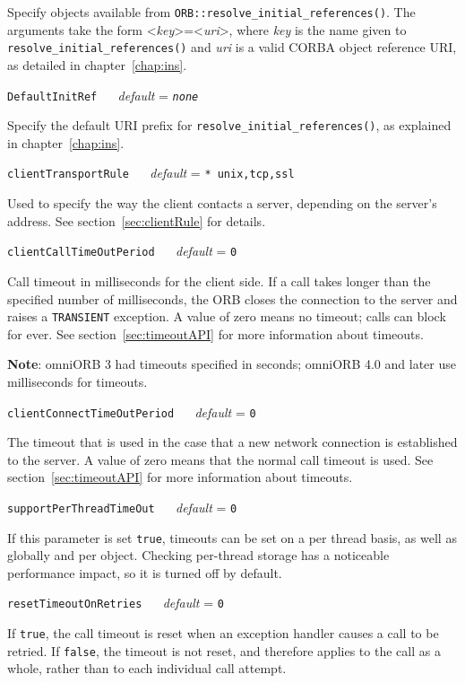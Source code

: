 \documentclass[11pt,twoside,a4paper]{book}
\makeatletter
\newcommand{\code}[1]{\texttt{#1}}
\newcommand{\op}[1]{\texttt{#1()}}
\newcommand{\confopt}[2]
  {\vspace{\baselineskip}\par\noindent\code{#1} ~~ \textit{default} =
   \code{#2}}
\renewcommand{\confopt}[2]
  {\vspace{\baselineskip}\par\noindent\code{#1} ~~ \textit{default} =
   \code{#2}\\[-1ex]\@afterheading}
\newcommand{\dsc}{\discretionary{}{}{}}
\makeatother
\begin{document}
Specify objects available from
\op{ORB::resolve\_initial\_references}. The arguments take the form
<\textit{key}>=<\textit{uri}>, where \textit{key} is the name given to
\op{resolve\_\dsc{}initial\_\dsc{}references} and \textit{uri} is a
valid CORBA object reference URI, as detailed in
chapter~\ref{chap:ins}.


\confopt{DefaultInitRef}{\textit{none}}

Specify the default URI prefix for
\op{resolve\_\dsc{}initial\_\dsc{}references}, as explained in
chapter~\ref{chap:ins}.


\confopt{clientTransportRule}{* unix,tcp,ssl}

Used to specify the way the client contacts a server, depending on the
server's address. See section~\ref{sec:clientRule} for details.


\confopt{clientCallTimeOutPeriod}{0}

Call timeout in milliseconds for the client side. If a call takes
longer than the specified number of milliseconds, the ORB closes the
connection to the server and raises a \code{TRANSIENT} exception. A
value of zero means no timeout; calls can block for ever. See
section~\ref{sec:timeoutAPI} for more information about timeouts.

\vspace{.5\baselineskip}

\noindent\textbf{Note}: omniORB 3 had timeouts specified in seconds;
omniORB 4.0 and later use milliseconds for timeouts.


\confopt{clientConnectTimeOutPeriod}{0}

The timeout that is used in the case that a new network connection is
established to the server. A value of zero means that the normal call
timeout is used. See section~\ref{sec:timeoutAPI} for more information
about timeouts.


\confopt{supportPerThreadTimeOut}{0}

If this parameter is set \code{true}, timeouts can be set on a per
thread basis, as well as globally and per object. Checking per-thread
storage has a noticeable performance impact, so it is turned off by
default.


\confopt{resetTimeoutOnRetries}{0}

If \code{true}, the call timeout is reset when an exception handler
causes a call to be retried. If \code{false}, the timeout is not
reset, and therefore applies to the call as a whole, rather than to
each individual call attempt.
\end{document}
